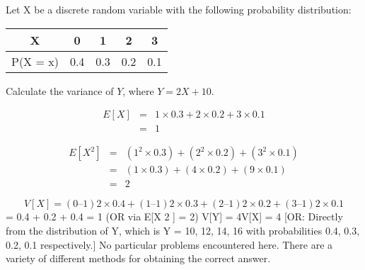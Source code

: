 \documentclass[a4paper,12pt]{article}
\begin{document}
\newpage
Let X be a discrete random variable with the following probability distribution:

\begin{center}
\begin{tabular}{ccccc}
X & 0&1 & 2 & 3 \\ \hline
P(X = x)&0.4 & 0.3 & 0.2 & 0.1 \\ \hline
\end{tabular}
\end{center}
Calculate the variance of $Y$, where $Y = 2X + 10$.

\newpage

\begin{eqnarray*}
E[X] &=& 1\times0.3 + 2\times0.2 + 3\times0.1\\
&=& 1
\end{eqnarray*}

\begin{eqnarray*}
E[X^2] 
&=& (1^2\times0.3) + (2^2\times0.2) + (3^2\times0.1)\\
&=& (1 \times 0.3) + (4 \times 0.2) + (9 \times 0.1) \\
&=& 2
\end{eqnarray*}




\[V[X] = (0 –1) 2 \times0.4 + (1 – 1) 2 \times0.3 + (2 – 1) 2 \times0.2 + (3 – 1) 2 \times0.1\]
= 0.4 + 0.2 + 0.4 = 1
(OR via E[X 2 ] = 2)
V[Y] = 4V[X] = 4
[OR: Directly from the distribution of Y, which is Y = 10, 12, 14, 16 with
probabilities 0.4, 0.3, 0.2, 0.1 respectively.]
No particular problems encountered here. There are a variety of different methods for
obtaining the correct answer.
\end{document}

